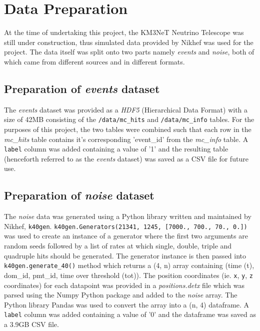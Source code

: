 
\chapter{Data Preparation} %
\label{cha:data-prep}


At the time of undertaking this project, the KM3NeT Neutrino Telescope was
still under construction, thus  simulated data provided by Nikhef was used for
the project. The data itself was split onto two parts namely \emph{events} and
\emph{noise}, both of which came from different sources and in different
formats.

\section{Preparation of \emph{events} dataset}%
\label{sec:data-prep-events}
The \emph{events} dataset was provided as a \emph{HDF5} (Hierarchical Data
Format) with a size of 42MB consisting of the \texttt{/data/mc\_hits} and
\texttt{/data/mc\_info} tables. For the purposes of this project, the two
tables were combined such that each row in the \textit{mc\_hits} table contains
it's corresponding 'event\_id' from the \textit{mc\_info}
table. A \texttt{label} column was added containing a value of '1' and the
resulting table (henceforth referred to as the \emph{events} dataset) was saved as
a CSV file for future use.

\section{Preparation of \emph{noise} dataset}%
\label{sec:data-prep-noise}
The \emph{noise} data was generated using a Python library written and
maintained by Nikhef, \texttt{k40gen}.
\texttt{k40gen.Generators(21341, 1245, [7000., 700., 70., 0.])} was
used to create an instance of a generator where the first two
arguments are random seeds followed by a list of rates at which
single, double, triple and quadruple hits should be generated. The
generator instance is then passed into \texttt{k40gen.generate\_40()}
method which returns a (4, n) array containing (time (t), dom\_id,
pmt\_id, time over threshold (tot)). The position coordinates (ie.
\texttt{x}, \texttt{y}, \texttt{z} coordinates) for each datapoint was
provided in a \emph{positions.detx} file which was parsed using the
Numpy Python package \cite{numpy} and added to the \emph{noise} array.
The Python library Pandas \cite{pandas} was used to convert the array
into a (n, 4) dataframe. A \texttt{label} column was added containing
a value of '0' and the dataframe was saved as a 3.9GB CSV file.

